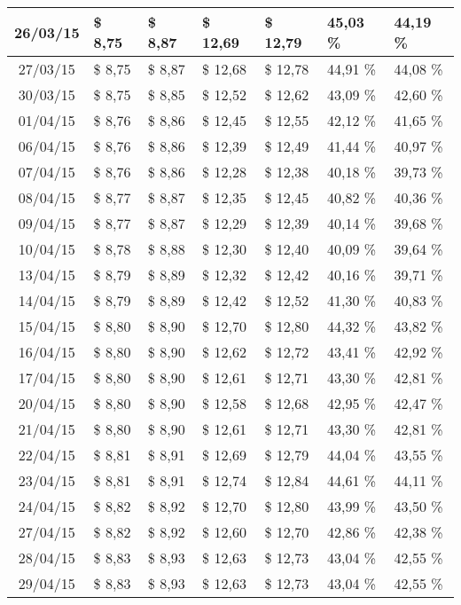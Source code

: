\begin{center}
\begin{longtable}{|c|p{1.5cm}|p{1.5cm}|p{1.5cm}|p{1.5cm}|p{1.5cm}|p{1.5cm}|}
26/03/15 & \$ 8,75 & \$ 8,87 & \$ 12,69 & \$ 12,79 & 45,03 \% & 44,19 \% \\ \hline
27/03/15 & \$ 8,75 & \$ 8,87 & \$ 12,68 & \$ 12,78 & 44,91 \% & 44,08 \% \\ \hline
30/03/15 & \$ 8,75 & \$ 8,85 & \$ 12,52 & \$ 12,62 & 43,09 \% & 42,60 \% \\ \hline
01/04/15 & \$ 8,76 & \$ 8,86 & \$ 12,45 & \$ 12,55 & 42,12 \% & 41,65 \% \\ \hline
06/04/15 & \$ 8,76 & \$ 8,86 & \$ 12,39 & \$ 12,49 & 41,44 \% & 40,97 \% \\ \hline
07/04/15 & \$ 8,76 & \$ 8,86 & \$ 12,28 & \$ 12,38 & 40,18 \% & 39,73 \% \\ \hline
08/04/15 & \$ 8,77 & \$ 8,87 & \$ 12,35 & \$ 12,45 & 40,82 \% & 40,36 \% \\ \hline
09/04/15 & \$ 8,77 & \$ 8,87 & \$ 12,29 & \$ 12,39 & 40,14 \% & 39,68 \% \\ \hline
10/04/15 & \$ 8,78 & \$ 8,88 & \$ 12,30 & \$ 12,40 & 40,09 \% & 39,64 \% \\ \hline
13/04/15 & \$ 8,79 & \$ 8,89 & \$ 12,32 & \$ 12,42 & 40,16 \% & 39,71 \% \\ \hline
14/04/15 & \$ 8,79 & \$ 8,89 & \$ 12,42 & \$ 12,52 & 41,30 \% & 40,83 \% \\ \hline
15/04/15 & \$ 8,80 & \$ 8,90 & \$ 12,70 & \$ 12,80 & 44,32 \% & 43,82 \% \\ \hline
16/04/15 & \$ 8,80 & \$ 8,90 & \$ 12,62 & \$ 12,72 & 43,41 \% & 42,92 \% \\ \hline
17/04/15 & \$ 8,80 & \$ 8,90 & \$ 12,61 & \$ 12,71 & 43,30 \% & 42,81 \% \\ \hline
20/04/15 & \$ 8,80 & \$ 8,90 & \$ 12,58 & \$ 12,68 & 42,95 \% & 42,47 \% \\ \hline
21/04/15 & \$ 8,80 & \$ 8,90 & \$ 12,61 & \$ 12,71 & 43,30 \% & 42,81 \% \\ \hline
22/04/15 & \$ 8,81 & \$ 8,91 & \$ 12,69 & \$ 12,79 & 44,04 \% & 43,55 \% \\ \hline
23/04/15 & \$ 8,81 & \$ 8,91 & \$ 12,74 & \$ 12,84 & 44,61 \% & 44,11 \% \\ \hline
24/04/15 & \$ 8,82 & \$ 8,92 & \$ 12,70 & \$ 12,80 & 43,99 \% & 43,50 \% \\ \hline
27/04/15 & \$ 8,82 & \$ 8,92 & \$ 12,60 & \$ 12,70 & 42,86 \% & 42,38 \% \\ \hline
28/04/15 & \$ 8,83 & \$ 8,93 & \$ 12,63 & \$ 12,73 & 43,04 \% & 42,55 \% \\ \hline
29/04/15 & \$ 8,83 & \$ 8,93 & \$ 12,63 & \$ 12,73 & 43,04 \% & 42,55 \% \\ \hline

\end{longtable}
\end{center}
